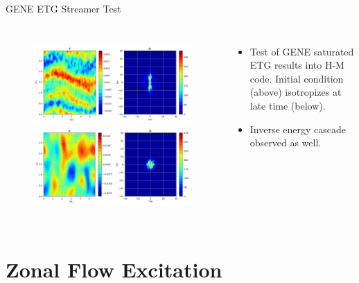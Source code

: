 \documentclass[aspectratio=43]{beamer}
\begin{document}
   \begin{frame}{GENE ETG Streamer Test}
      \begin{columns}
            \begin{figure}
               \includegraphics[height=.4\textheight,width=\textwidth]{Images/hmETG_geneInit2.pdf}
               \\
               \includegraphics[height=.4\textheight,width=\textwidth]{Images/hmETG_geneIso2.pdf}
            \end{figure}
            \begin{itemize}
               \item Test of GENE saturated ETG results into H-M code. Initial condition (above) isotropizes at late time (below).
               \item Inverse energy cascade observed as well.
            \end{itemize}
      \end{columns}
   \end{frame}

   \section{Zonal Flow Excitation}
\end{document}
